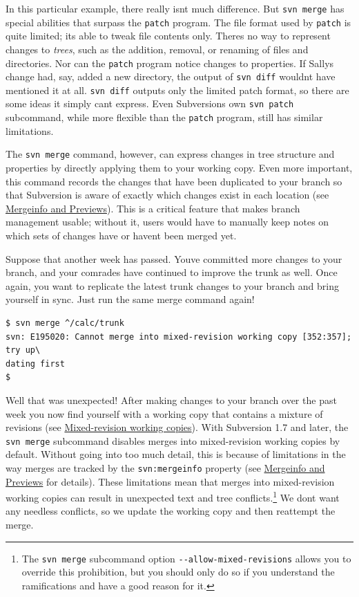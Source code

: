 In this particular example, there really isn\textquotesingle t much
difference. But \texttt{svn\ merge} has special abilities that surpass
the \texttt{patch} program. The file format used by \texttt{patch} is
quite limited; it\textquotesingle s able to tweak file contents only.
There\textquotesingle s no way to represent changes to \emph{trees},
such as the addition, removal, or renaming of files and directories. Nor
can the \texttt{patch} program notice changes to properties. If
Sally\textquotesingle s change had, say, added a new directory, the
output of \texttt{svn\ diff} wouldn\textquotesingle t have mentioned it
at all. \texttt{svn\ diff} outputs only the limited patch format, so
there are some ideas it simply can\textquotesingle t express. Even
Subversion\textquotesingle s own \texttt{svn\ patch} subcommand, while
more flexible than the \texttt{patch} program, still has similar
limitations.

The \texttt{svn\ merge} command, however, can express changes in tree
structure and properties by directly applying them to your working copy.
Even more important, this command records the changes that have been
duplicated to your branch so that Subversion is aware of exactly which
changes exist in each location (see
\hyperref[svn.branchmerge.basicmerging.mergeinfo]{Mergeinfo and
Previews}). This is a critical feature that makes branch management
usable; without it, users would have to manually keep notes on which
sets of changes have or haven\textquotesingle t been merged yet.

Suppose that another week has passed. You\textquotesingle ve committed
more changes to your branch, and your comrades have continued to improve
the trunk as well. Once again, you want to replicate the latest trunk
changes to your branch and bring yourself in sync. Just run the same
merge command again!

\begin{verbatim}
$ svn merge ^/calc/trunk
svn: E195020: Cannot merge into mixed-revision working copy [352:357]; try up\
dating first
$
\end{verbatim}

Well that was unexpected! After making changes to your branch over the
past week you now find yourself with a working copy that contains a
mixture of revisions (see
\hyperref[svn.basic.in-action.mixedrevs]{Mixed-revision working
copies}). With Subversion 1.7 and later, the \texttt{svn\ merge}
subcommand disables merges into mixed-revision working copies by
default. Without going into too much detail, this is because of
limitations in the way merges are tracked by the \texttt{svn:mergeinfo}
property (see
\hyperref[svn.branchmerge.basicmerging.mergeinfo]{Mergeinfo and
Previews} for details). These limitations mean that merges into
mixed-revision working copies can result in unexpected text and tree
conflicts.\footnote{The \texttt{svn\ merge} subcommand option
  \texttt{-\/-allow-mixed-revisions} allows you to override this
  prohibition, but you should only do so if you understand the
  ramifications and have a good reason for it.} We don\textquotesingle t
want any needless conflicts, so we update the working copy and then
reattempt the merge.

